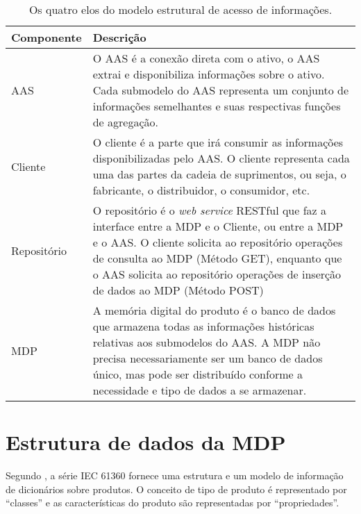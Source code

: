 	\begin{table}[htb]
		\centering
		\caption{Os quatro elos do modelo estrutural de acesso de informações.}
		\label{tab:4-elos}
		\begin{tabular}{lp{12cm}}
			\hline
			\rowcolor[HTML]{F0F0F0} 
			{\color[HTML]{000000} \textbf{Componente}} 
			& {\color[HTML]{000000} \textbf{Descrição}} \\ \hline
			\rowcolor[HTML]{FFFFFF} 
			{\color[HTML]{000000} AAS}         
			& {\color[HTML]{000000} O AAS é a conexão direta com o ativo, o AAS extrai e disponibiliza informações sobre o ativo. Cada submodelo do AAS representa um conjunto de informações semelhantes e suas respectivas funções de agregação.} \\
			\rowcolor[HTML]{F7F7F7} 
			{\color[HTML]{000000} Cliente}     
			& {\color[HTML]{000000} O cliente é a parte que irá consumir as informações disponibilizadas pelo AAS. O cliente representa cada uma das partes da cadeia de suprimentos, ou seja, o fabricante, o distribuidor, o consumidor, etc. }  \\
			\rowcolor[HTML]{FFFFFF} 
			{\color[HTML]{000000} Repositório}
			& {\color[HTML]{000000} O repositório é o \textit{web service} RESTful que faz a interface entre a MDP e o Cliente, ou entre a MDP e o AAS. O cliente solicita ao repositório operações de consulta ao MDP (Método GET), enquanto que o AAS solicita ao repositório operações de inserção de dados ao MDP (Método POST)}        \\
			\rowcolor[HTML]{F7F7F7} 
			{\color[HTML]{000000} MDP}
			& {\color[HTML]{000000} A memória digital do produto é o banco de dados que armazena todas as informações históricas relativas aos submodelos do AAS. A MDP não precisa necessariamente ser um banco de dados único, mas pode ser distribuído conforme a necessidade e tipo de dados a se armazenar.}       
		\end{tabular}
	\end{table}
	
\section{Estrutura de dados da MDP}

	Segundo , a série IEC 61360 fornece uma estrutura e um modelo de informação de dicionários sobre produtos. O conceito de tipo de produto é representado por ``classes'' e as características do produto são representadas por ``propriedades''.

